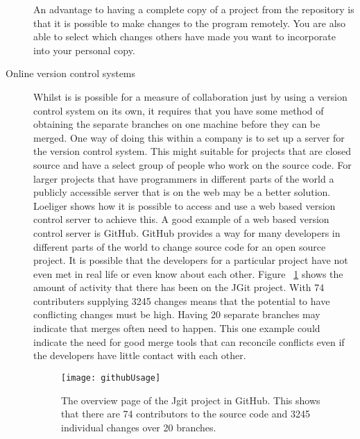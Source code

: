 \begin{description}
  An advantage to having a complete copy of a project from the repository is that it is possible to make changes to the program remotely.  You are also able to select which changes others have made you want to incorporate into your personal copy. 
  \item [Online version control systems]  
  Whilst is is possible for a measure of collaboration just by using a version control system on its own, it requires that you have some method of obtaining the separate branches on one machine before they can be merged.  One way of doing this within a company is to set up a server for the version control system.  This might suitable for projects that are closed source and have a select group of people who work on the source code.  For larger projects that have programmers in different parts of the world a publicly accessible server that is on the web may be a better solution. Loeliger \cite{Loeliger2006} shows how it is possible to access and use a web based version control server to achieve this. A good example of a web based version control server is GitHub.  GitHub provides a way for many developers in different parts of the world to change source code for an open source project.  It is possible that the developers for a particular project have not even met in real life or even know about each other. Figure ~\ref{fig:bgUsage} shows the amount of activity that there has been on the JGit project.  With 74 contributers supplying 3245 changes means that the potential to have conflicting changes must be high. Having 20 separate branches may indicate that merges often need to happen. This one example could indicate the need for good merge tools that can reconcile conflicts even if the developers have little contact with each other.

  \begin{figure}[!T]
   \begin{center}
    \texttt{[image: githubUsage]}
   \end{center}
   \caption{The overview page of the Jgit project in GitHub. This shows that there are 74 contributors to the source code and 3245 individual changes over 20 branches.}
   \label{fig:bgUsage}
  \end{figure}


  
\end{description}

